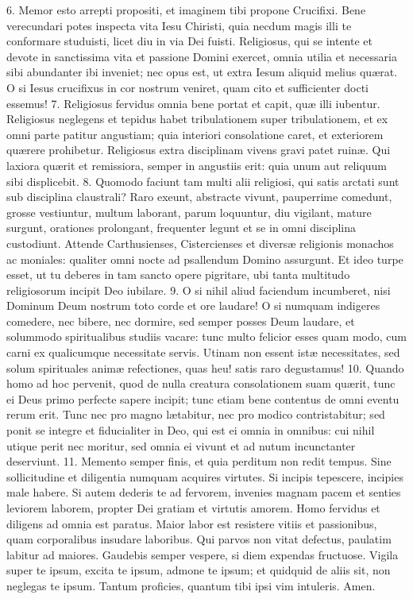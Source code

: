 \documentclass[twoside]{article}
\begin{document}
6. Memor esto arrepti propositi, et imaginem tibi propone Crucifixi. Bene verecundari potes inspecta vita Iesu Chiristi, quia necdum magis illi te conformare studuisti, licet diu in via Dei fuisti. Religiosus, qui se intente et devote in sanctissima vita et passione Domini exercet, omnia utilia et necessaria sibi abundanter ibi inveniet; nec opus est, ut extra Iesum aliquid melius quærat. O si Iesus crucifixus in cor nostrum veniret, quam cito et sufficienter docti essemus!
7. Religiosus fervidus omnia bene portat et capit, quæ illi iubentur. Religiosus neglegens et tepidus habet tribulationem super tribulationem, et ex omni parte patitur angustiam; quia interiori consolatione caret, et exteriorem quærere prohibetur. Religiosus extra disciplinam vivens gravi patet ruinæ. Qui laxiora quærit et remissiora, semper in angustiis erit: quia unum aut reliquum sibi displicebit.
8. Quomodo faciunt tam multi alii religiosi, qui satis arctati sunt sub disciplina claustrali? Raro exeunt, abstracte vivunt, pauperrime comedunt, grosse vestiuntur, multum laborant, parum loquuntur, diu vigilant, mature surgunt, orationes prolongant, frequenter legunt et se in omni disciplina custodiunt. Attende Carthusienses, Cistercienses et diversæ religionis monachos ac moniales: qualiter omni nocte ad psallendum Domino assurgunt. Et ideo turpe esset, ut tu deberes in tam sancto opere pigritare, ubi tanta multitudo religiosorum incipit Deo iubilare.
9. O si nihil aliud faciendum incumberet, nisi Dominum Deum nostrum toto corde et ore laudare! O si numquam indigeres comedere, nec bibere, nec dormire, sed semper posses Deum laudare, et solummodo spiritualibus studiis vacare: tunc multo felicior esses quam modo, cum carni ex qualicumque necessitate servis. Utinam non essent istæ necessitates, sed solum spirituales animæ refectiones, quas heu! satis raro degustamus!
10. Quando homo ad hoc pervenit, quod de nulla creatura consolationem suam quærit, tunc ei Deus primo perfecte sapere incipit; tunc etiam bene contentus de omni eventu rerum erit. Tunc nec pro magno lætabitur, nec pro modico contristabitur; sed ponit se integre et fiducialiter in Deo, qui est ei omnia in omnibus: cui nihil utique perit nec moritur, sed omnia ei vivunt et ad nutum incunctanter deserviunt.
11. Memento semper finis, et quia perditum non redit tempus. Sine sollicitudine et diligentia numquam acquires virtutes. Si incipis tepescere, incipies male habere. Si autem dederis te ad fervorem, invenies magnam pacem et senties leviorem laborem, propter Dei gratiam et virtutis amorem. Homo fervidus et diligens ad omnia est paratus. Maior labor est resistere vitiis et passionibus, quam corporalibus insudare laboribus. Qui parvos non vitat defectus, paulatim labitur ad maiores. Gaudebis semper vespere, si diem expendas fructuose. Vigila super te ipsum, excita te ipsum, admone te ipsum; et quidquid de aliis sit, non neglegas te ipsum. Tantum proficies, quantum tibi ipsi vim intuleris. Amen.
\end{document}
